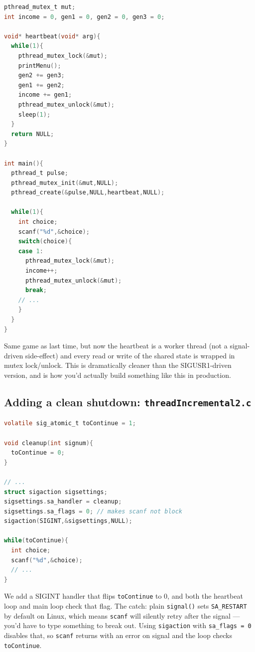 \documentclass[11pt]{article}
\begin{document}
\begin{lstlisting}[language=C]
pthread_mutex_t mut;
int income = 0, gen1 = 0, gen2 = 0, gen3 = 0;

void* heartbeat(void* arg){
  while(1){
    pthread_mutex_lock(&mut);
    printMenu();
    gen2 += gen3;
    gen1 += gen2;
    income += gen1;
    pthread_mutex_unlock(&mut);
    sleep(1);
  }
  return NULL;
}

int main(){
  pthread_t pulse;
  pthread_mutex_init(&mut,NULL);
  pthread_create(&pulse,NULL,heartbeat,NULL);

  while(1){
    int choice;
    scanf("%d",&choice);
    switch(choice){
    case 1:
      pthread_mutex_lock(&mut);
      income++;
      pthread_mutex_unlock(&mut);
      break;
    // ...
    }
  }
}
\end{lstlisting}

Same game as last time, but now the heartbeat is a worker thread
(not a signal-driven side-effect) and every read or write of the
shared state is wrapped in mutex lock/unlock. This is dramatically
cleaner than the SIGUSR1-driven version, and is how you'd actually
build something like this in production.

\subsection*{Adding a clean shutdown: \texttt{threadIncremental2.c}}

\begin{lstlisting}[language=C]
volatile sig_atomic_t toContinue = 1;

void cleanup(int signum){
  toContinue = 0;
}

// ...
struct sigaction sigsettings;
sigsettings.sa_handler = cleanup;
sigsettings.sa_flags = 0; // makes scanf not block
sigaction(SIGINT,&sigsettings,NULL);

while(toContinue){
  int choice;
  scanf("%d",&choice);
  // ...
}
\end{lstlisting}

We add a SIGINT handler that flips \texttt{toContinue} to 0, and
both the heartbeat loop and main loop check that flag. The catch:
plain \texttt{signal()} sets \texttt{SA\_RESTART} by default on
Linux, which means \texttt{scanf} will silently retry after the
signal --- you'd have to type something to break out. Using
\texttt{sigaction} with \texttt{sa\_flags = 0} disables that, so
\texttt{scanf} returns with an error on signal and the loop checks
\texttt{toContinue}.
\end{document}

